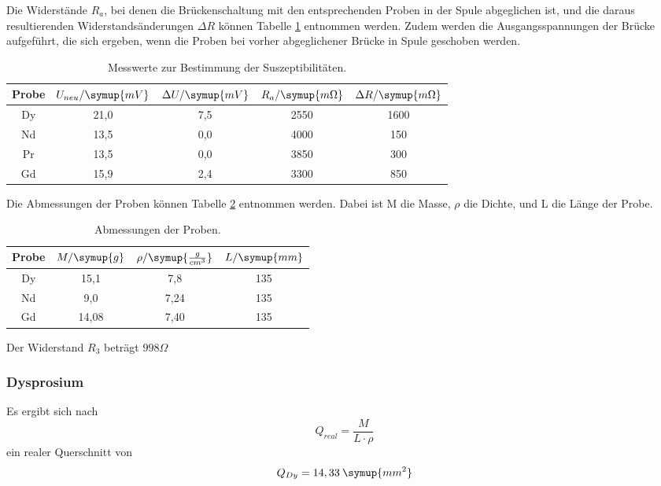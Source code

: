 Die Widerstände $R_a$, bei denen die Brückenschaltung mit den entsprechenden Proben
in der Spule abgeglichen ist, und die daraus resultierenden Widerstandsänderungen $\Delta R$ können
Tabelle \ref{tab:Widerstand} entnommen werden. Zudem werden die Ausgangsspannungen der Brücke aufgeführt,
die sich ergeben, wenn die Proben bei vorher abgeglichener Brücke in Spule geschoben werden.
\begin{table}[H]
  \centering
  \caption{Messwerte zur Bestimmung der Suszeptibilitäten.}
  \label{tab:Widerstand}
  \begin{tabular}{c c c c c}
    \toprule
    Probe & $U_{neu} / \symup{mV}$ & $\Delta U / \symup{mV}$ &  $R_a / \symup{m\Omega}$   & $\Delta R / \symup{m\Omega}$  \\
    \midrule
    Dy & 21,0 & 7,5 & 2550 & 1600 \\
    Nd & 13,5 & 0,0 & 4000 & 150 \\
    Pr & 13,5 & 0,0 & 3850 & 300 \\
    Gd & 15,9 & 2,4 & 3300 & 850 \\
    \bottomrule
  \end{tabular}
\end{table}

Die Abmessungen der Proben können Tabelle \ref{tab:Dy} entnommen werden.
Dabei ist M die Masse, $\rho$ die Dichte, und L die Länge der Probe.

\begin{table}[H]
  \centering
  \caption{Abmessungen der Proben.}
  \label{tab:Dy}
  \begin{tabular}{c c c c}
    \toprule
    Probe & $M/ \symup{g}$ & $\rho / \symup{\frac{g}{cm^3}}$   & $L / \symup{mm}$  \\
    \midrule
    Dy & 15,1 & 7,8 & 135\\
    Nd & 9,0 & 7,24 & 135\\
    Gd & 14,08 & 7,40 & 135\\
    \bottomrule
  \end{tabular}
\end{table}


Der Widerstand $R_3$ beträgt $998 \Omega$

\subsubsection{Dysprosium}
Es ergibt sich nach
\begin{equation*}
  Q_{real} = \frac{M}{L \cdot \rho}
\end{equation*}
ein realer Querschnitt von
\begin{equation*}
  Q_{Dy} = 14,33 \: \symup{mm^2}
\end{equation*}

